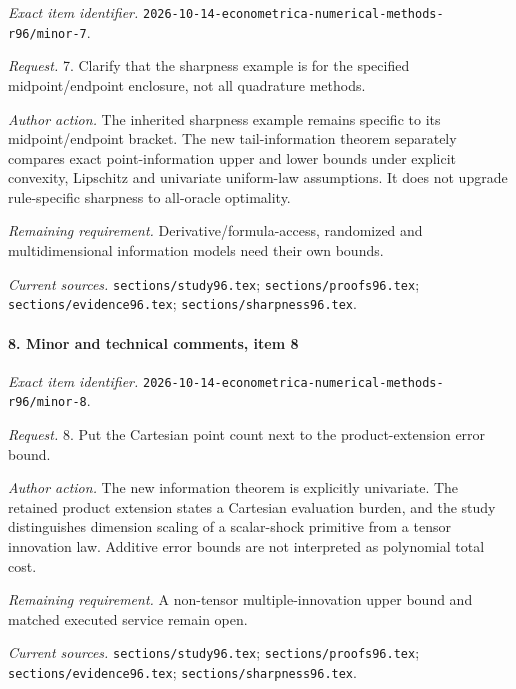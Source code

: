 \emph{Exact item identifier.} \nolinkurl{2026-10-14-econometrica-numerical-methods-r96/minor-7}.

\par\emph{Request.} 7. Clarify that the sharpness example is for the specified midpoint/\allowbreak{}endpoint enclosure, not all quadrature methods.

\par\emph{Author action.} The inherited sharpness example remains specific to its midpoint/\allowbreak{}endpoint bracket. The new tail-information theorem separately compares exact point-information upper and lower bounds under explicit convexity, Lipschitz and univariate uniform-law assumptions. It does not upgrade rule-specific sharpness to all-oracle optimality.

\par\emph{Remaining requirement.} Derivative/\allowbreak{}formula-access, randomized and multidimensional information models need their own bounds.

\par\emph{Current sources.} \nolinkurl{sections/study96.tex}; \nolinkurl{sections/proofs96.tex}; \nolinkurl{sections/evidence96.tex}; \nolinkurl{sections/sharpness96.tex}.

\paragraph{8. Minor and technical comments, item 8}

\emph{Exact item identifier.} \nolinkurl{2026-10-14-econometrica-numerical-methods-r96/minor-8}.

\par\emph{Request.} 8. Put the Cartesian point count next to the product-extension error bound.

\par\emph{Author action.} The new information theorem is explicitly univariate. The retained product extension states a Cartesian evaluation burden, and the study distinguishes dimension scaling of a scalar-shock primitive from a tensor innovation law. Additive error bounds are not interpreted as polynomial total cost.

\par\emph{Remaining requirement.} A non-tensor multiple-innovation upper bound and matched executed service remain open.

\par\emph{Current sources.} \nolinkurl{sections/study96.tex}; \nolinkurl{sections/proofs96.tex}; \nolinkurl{sections/evidence96.tex}; \nolinkurl{sections/sharpness96.tex}.

